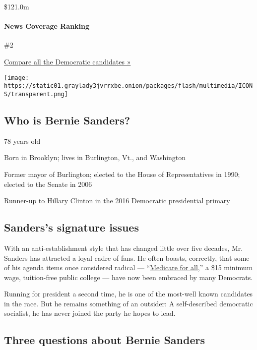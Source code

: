 \$121.0m

\hypertarget{news-coverage-ranking}{%
\paragraph{News Coverage Ranking}\label{news-coverage-ranking}}

\#2

\href{https://www.nytimes3xbfgragh.onion/interactive/2020/us/elections/democratic-polls.html}{Compare
all the Democratic candidates »}

\texttt{[image: https://static01.graylady3jvrrxbe.onion/packages/flash/multimedia/ICONS/transparent.png]}

\hypertarget{who-is-bernie-sanders}{%
\subsection{Who is Bernie Sanders?}\label{who-is-bernie-sanders}}

78 years old

Born in Brooklyn; lives in Burlington, Vt., and Washington

Former mayor of Burlington; elected to the House of Representatives in
1990; elected to the Senate in 2006

Runner-up to Hillary Clinton in the 2016 Democratic presidential primary

\hypertarget{sanderss-signature-issues}{%
\subsection{Sanders's signature
issues}\label{sanderss-signature-issues}}

With an anti-establishment style that has changed little over five
decades, Mr. Sanders has attracted a loyal cadre of fans. He often
boasts, correctly, that some of his agenda items once considered radical
---
``\href{https://www.nytimes3xbfgragh.onion/2019/06/27/us/politics/bernie-sanders-medicare-for-all.html}{Medicare
for all},'' a \$15 minimum wage, tuition-free public college --- have
now been embraced by many Democrats.

Running for president a second time, he is one of the most-well known
candidates in the race. But he remains something of an outsider: A
self-described democratic socialist, he has never joined the party he
hopes to lead.

\hypertarget{three-questions-about-bernie-sanders}{%
\subsection{Three questions about Bernie
Sanders}\label{three-questions-about-bernie-sanders}}

